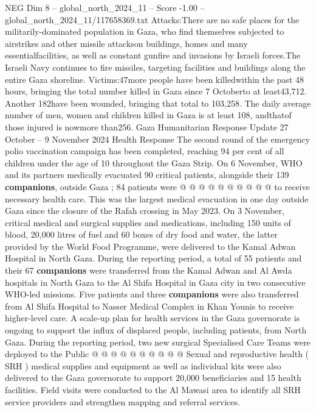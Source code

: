 \begin{textsample}{NEG Dim 8 – global\_north\_2024\_11 – Score -1.00 – global\_north\_2024\_11/117658369.txt}  \label{ex:f8_neg_304}
Attacks:There are no safe places for the militarily-dominated population in Gaza, who find themselves subjected to airstrikes and other missile attackson buildings, homes and many essentialfacilities, as well as constant gunfire and invasions by Israeli forces.The Israeli Navy continues to fire missiles, targeting facilities and buildings along the entire Gaza shoreline.
Victims:47more people have been killedwithin the past 48 hours, bringing the total number killed in Gaza since 7 Octoberto at least43,712.
Another 182have been wounded, bringing that total to 103,258.
The daily average number of men, women and children killed in Gaza is at least 108, andthatof those injured is nowmore than256.
Gaza Humanitarian Response Update 27 October -- 9 November 2024 Health Response The second round of the emergency polio vaccination campaign has been completed, reaching 94 per cent of all children under the age of 10 throughout the Gaza Strip.
On 6 November, WHO and its partners medically evacuated 90 critical patients, alongside their 139 \textbf{companions}, outside Gaza ; 84 patients were @ @ @ @ @ @ @ @ @ @ to receive necessary health care.
This was the largest medical evacuation in one day outside Gaza since the closure of the Rafah crossing in May 2023.
On 3 November, critical medical and surgical supplies and medications, including 150 units of blood, 20,000 litres of fuel and 60 boxes of dry food and water, the latter provided by the World Food Programme, were delivered to the Kamal Adwan Hospital in North Gaza.
During the reporting period, a total of 55 patients and their 67 \textbf{companions} were transferred from the Kamal Adwan and Al Awda hospitals in North Gaza to the Al Shifa Hospital in Gaza city in two consecutive WHO-led missions.
Five patients and three \textbf{companions} were also transferred from Al Shifa Hospital to Nasser Medical Complex in Khan Younis to receive higher-level care.
A scale-up plan for health services in the Gaza governorate is ongoing to support the influx of displaced people, including patients, from North Gaza.
During the reporting period, two new surgical Specialised Care Teams were deployed to the Public @ @ @ @ @ @ @ @ @ @ Sexual and reproductive health ( SRH ) medical supplies and equipment as well as individual kits were also delivered to the Gaza governorate to support 20,000 beneficiaries and 15 health facilities.
Field visits were conducted to the Al Mawasi area to identify all SRH service providers and strengthen mapping and referral services.

\end{textsample}

